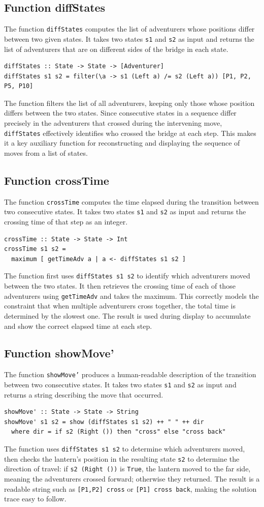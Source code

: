 \documentclass[a4paper,12pt]{report}
\begin{document}
\subsection{Function diffStates}
The function \texttt{diffStates} computes the list of adventurers whose
positions differ between two given states. It takes two states \texttt{s1}
and \texttt{s2} as input and returns the list of adventurers that are on
different sides of the bridge in each state.
\begin{verbatim}
diffStates :: State -> State -> [Adventurer]
diffStates s1 s2 = filter(\a -> s1 (Left a) /= s2 (Left a)) [P1, P2, P5, P10]
\end{verbatim}
The function filters the list of all adventurers, keeping only those whose
position differs between the two
states. Since consecutive states in a sequence differ precisely in the
adventurers that crossed during the intervening move, \texttt{diffStates}
effectively identifies who crossed the bridge at each step. This makes it
a key auxiliary function for reconstructing and displaying the sequence of
moves from a list of states.
\subsection{Function crossTime}
The function \texttt{crossTime} computes the time elapsed during the
transition between two consecutive states. It takes two states \texttt{s1}
and \texttt{s2} as input and returns the crossing time of that step as an integer.
\begin{verbatim}
crossTime :: State -> State -> Int
crossTime s1 s2 =
  maximum [ getTimeAdv a | a <- diffStates s1 s2 ]
\end{verbatim}
The function first uses \texttt{diffStates s1 s2} to identify which
adventurers moved between the two states. It then retrieves the crossing
time of each of those adventurers using \texttt{getTimeAdv} and takes
the maximum. This correctly models the constraint that when multiple
adventurers cross together, the total time is determined by the slowest one.
The result is used during display to accumulate and show the correct
elapsed time at each step.
\subsection{Function showMove'}
The function \texttt{showMove'} produces a human-readable description
of the transition between two consecutive states. It takes two states
\texttt{s1} and \texttt{s2} as input and returns a string describing
the move that occurred.
\begin{verbatim}
showMove' :: State -> State -> String
showMove' s1 s2 = show (diffStates s1 s2) ++ " " ++ dir
  where dir = if s2 (Right ()) then "cross" else "cross back"
\end{verbatim}
The function uses \texttt{diffStates s1 s2} to determine which
adventurers moved, then checks the lantern's position in the resulting
state \texttt{s2} to determine the direction of travel: if
\texttt{s2 (Right ())} is \texttt{True}, the lantern moved to the far
side, meaning the adventurers crossed forward; otherwise they returned.
The result is a readable string such as \texttt{[P1,P2] cross} or
\texttt{[P1] cross back}, making the solution trace easy to follow.
\end{document}

